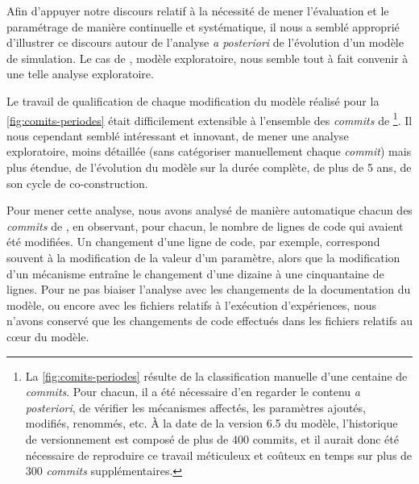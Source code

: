 Afin d'appuyer notre discours relatif à la nécessité de mener l'évaluation et le paramétrage de manière continuelle et systématique, il nous a semblé approprié d'illustrer ce discours autour de l'analyse \textit{a posteriori} de l'évolution d'un modèle de simulation.
Le cas de \simfeodal{}, modèle exploratoire, nous semble tout à fait convenir à une telle analyse exploratoire.

Le travail de qualification de chaque modification du modèle réalisé pour la \cref{fig:comits-periodes} était difficilement extensible à l'ensemble des \textit{commits} de \simfeodal{}\footnote{
	La \cref{fig:comits-periodes} résulte de la classification manuelle d'une centaine de \textit{commits}.
	Pour chacun, il a été nécessaire d'en regarder le contenu \textit{a posteriori}, de vérifier les mécanismes affectés, les paramètres ajoutés, modifiés, renommés, etc.
	À la date de la version 6.5 du modèle, l'historique de versionnement est composé de plus de 400 commits, et il aurait donc été nécessaire de reproduire ce travail méticuleux et coûteux en temps sur plus de 300 \textit{commits} supplémentaires.
}.
Il nous cependant semblé intéressant et innovant, de mener une analyse exploratoire, moins détaillée (sans catégoriser manuellement chaque \textit{commit}) mais plus étendue, de l'évolution du modèle \simfeodal{} sur la durée complète, de plus de 5 ans, de son cycle de co-construction.

Pour mener cette analyse, nous avons analysé de manière automatique chacun des \textit{commits} de \simfeodal{}, en observant, pour chacun, le nombre de lignes de code qui avaient été modifiées.
Un changement d'une ligne de code, par exemple, correspond souvent à la modification de la valeur d'un paramètre, alors que la modification d'un mécanisme entraîne le changement d'une dizaine à une cinquantaine de lignes.
Pour ne pas biaiser l'analyse avec les changements de la documentation du modèle, ou encore avec les fichiers relatifs à l'exécution d'expériences, nous n'avons conservé que les changements de code effectués dans les fichiers relatifs au cœur du modèle.

